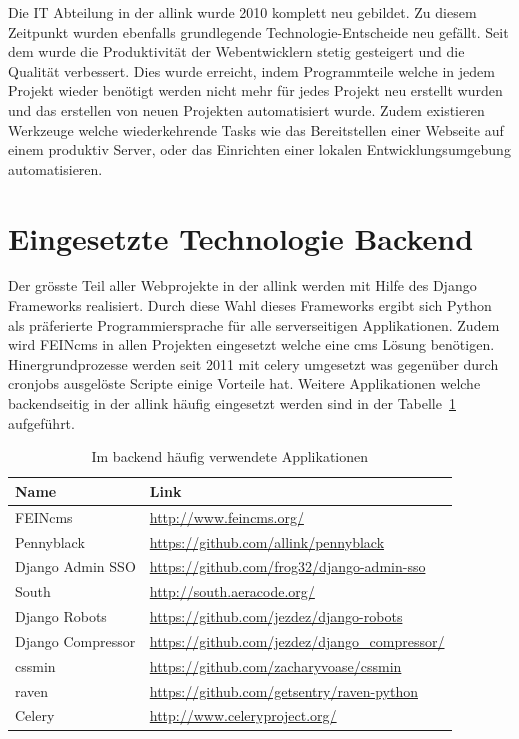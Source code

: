 
Die IT Abteilung in der allink wurde 2010 komplett neu gebildet. Zu diesem Zeitpunkt wurden ebenfalls grundlegende Technologie-Entscheide neu gefällt. Seit dem wurde die Produktivität der Webentwicklern stetig gesteigert und die Qualität verbessert. Dies wurde erreicht, indem Programmteile welche in jedem Projekt wieder benötigt werden nicht mehr für jedes Projekt neu erstellt wurden und das erstellen von neuen Projekten automatisiert wurde. Zudem existieren Werkzeuge welche wiederkehrende Tasks wie das Bereitstellen einer Webseite auf einem produktiv Server, oder das Einrichten einer lokalen Entwicklungsumgebung automatisieren.

\section{Eingesetzte Technologie Backend}
\label{sec:eingesetzte_technologie_backend}
Der grösste Teil aller Webprojekte in der allink werden mit Hilfe des Django Frameworks realisiert. Durch diese Wahl dieses Frameworks ergibt sich Python als präferierte Programmiersprache für alle serverseitigen Applikationen. Zudem wird FEINcms in allen Projekten eingesetzt welche eine cms Lösung benötigen. Hinergrundprozesse werden seit 2011 mit celery umgesetzt was gegenüber durch cronjobs ausgelöste Scripte einige Vorteile hat. Weitere Applikationen welche backendseitig in der allink häufig eingesetzt werden sind in der Tabelle~\ref{tab:backend_applications} aufgeführt.

\begin{table}[ht]
  \centering
  \begin{tabular}{ll}
  \toprule
    Name & Link\\
  \midrule
    FEINcms & \url{http://www.feincms.org/}\\
  \midrule
    Pennyblack & \url{https://github.com/allink/pennyblack}\\
  \midrule
    Django Admin SSO & \url{https://github.com/frog32/django-admin-sso}\\
  \midrule
    South & \url{http://south.aeracode.org/}\\
  \midrule
    Django Robots & \url{https://github.com/jezdez/django-robots}\\
  \midrule
    Django Compressor & \url{https://github.com/jezdez/django_compressor/}\\
  \midrule
    cssmin & \url{https://github.com/zacharyvoase/cssmin}\\
  \midrule
    raven & \url{https://github.com/getsentry/raven-python}\\
  \midrule
    Celery & \url{http://www.celeryproject.org/}\\
  \bottomrule
  \end{tabular}
  \caption{Im backend häufig verwendete Applikationen}
  \label{tab:backend_applications}
\end{table}

